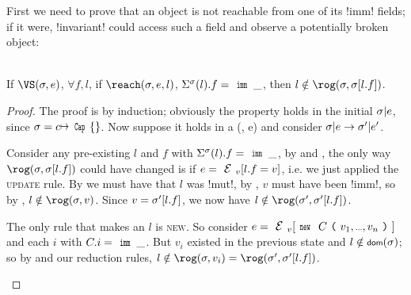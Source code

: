 First we need to prove that an object is not reachable from one of its \Q!imm! fields; if it were, \Q!invariant! could access such a field and observe a potentially broken object:\SS
\begin{Lemma}\rm\ \\
\indent If $\VS(\s, e)$, $\forall f,l$, if $\reach(\s, e, l)$, $\Ss(l).f = \Kw{imm}\,\_$, then $l \notin \rog(\s, \s[l.f])$.
\end{Lemma}\SS
\begin{proof}
The proof is by induction; obviously the property holds in the initial $\sigma|e$, since $\s = c\mapsto \Kw{Cap}\{\}$. Now suppose it holds in a \VS(\s, e) and consider $\sigma|e \rightarrow \sigma'|e'$.
\begin{ienumerate}
	\item Consider any pre-existing \reach $l$ and $f$ with $\Ss(l).f = \Kw{imm}\,\_$, by  and , the only way $\rog(\s, \s[l.f])$ could have changed is if $e = \EV[l.f = v]$, i.e. we just applied the \textsc{update} rule. By  we must have that $l$ was \Q!mut!, by , $v$ must have been \Q!imm!, so by , $l \notin \rog(\s, v)$. Since $v = \sigma'[l.f]$, we now have $l \notin \rog(\s', \s'[l.f])$.
	\item The only rule that makes an $l$ \reach is \textsc{new}. So consider $e =\EV[\Kw{new}\ C\oR v_1,\ldots,v_n\cR]$ and each $i$ with $C.i = \Kw{imm}\,\_$. But $v_i$ existed in the previous state and $l \notin \dom(\s)$; so by \VS and our reduction rules, $l \notin \rog(\s, v_i) = \rog(\s', \s'[l.f])$.
\end{ienumerate}
\end{proof}

